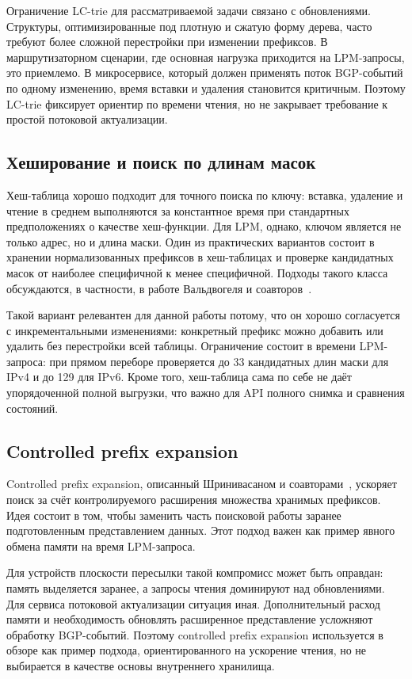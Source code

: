 Ограничение LC-trie для рассматриваемой задачи связано с обновлениями.
Структуры, оптимизированные под плотную и сжатую форму дерева, часто
требуют более сложной перестройки при изменении префиксов. В
маршрутизаторном сценарии, где основная нагрузка приходится на LPM-запросы,
это приемлемо. В микросервисе, который должен применять поток BGP-событий
по одному изменению, время вставки и удаления становится критичным.
Поэтому LC-trie фиксирует ориентир по времени чтения, но не закрывает
требование к простой потоковой актуализации.

\subsection{Хеширование и поиск по длинам масок}

Хеш-таблица хорошо подходит для точного поиска по ключу: вставка,
удаление и чтение в среднем выполняются за константное время при
стандартных предположениях о качестве хеш-функции. Для LPM, однако,
ключом является не только адрес, но и длина маски. Один из
практических вариантов состоит в хранении нормализованных префиксов в
хеш-таблицах и проверке кандидатных масок от наиболее специфичной к
менее специфичной. Подходы такого класса обсуждаются, в частности, в
работе Вальдвогеля и соавторов~\cite{waldvogel1997scalable}.

Такой вариант релевантен для данной работы потому, что он хорошо
согласуется с инкрементальными изменениями: конкретный префикс можно
добавить или удалить без перестройки всей таблицы. Ограничение состоит в
времени LPM-запроса: при прямом переборе проверяется до 33 кандидатных
длин маски для IPv4 и до 129 для IPv6. Кроме того, хеш-таблица сама по себе не
даёт упорядоченной полной выгрузки, что важно для API полного снимка и
сравнения состояний.

\subsection{Controlled prefix expansion}

Controlled prefix expansion, описанный Шринивасаном и
соавторами~\cite{srinivasan1999prefixexpansion}, ускоряет поиск за счёт
контролируемого расширения множества хранимых префиксов. Идея состоит в
том, чтобы заменить часть поисковой работы заранее подготовленным
представлением данных. Этот подход важен как пример явного обмена памяти
на время LPM-запроса.

Для устройств плоскости пересылки такой компромисс может быть оправдан:
память выделяется заранее, а запросы чтения доминируют над обновлениями.
Для сервиса потоковой актуализации ситуация иная. Дополнительный расход
памяти и необходимость обновлять расширенное представление усложняют
обработку BGP-событий. Поэтому controlled prefix expansion используется
в обзоре как пример подхода, ориентированного на ускорение чтения, но не выбирается в
качестве основы внутреннего хранилища.

